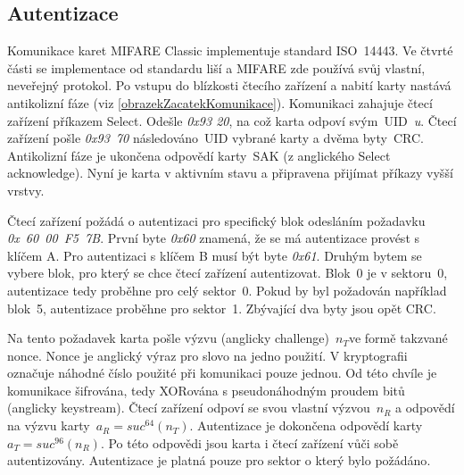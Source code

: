 \subsection{Autentizace}
\label{autentizace}
Komunikace karet MIFARE Classic implementuje standard ISO~14443. Ve čtvrté části se implementace od standardu liší a MIFARE zde používá svůj vlastní, neveřejný protokol. Po vstupu do blízkosti čtecího zařízení a nabití karty nastává antikolizní fáze (viz \ref{obrazekZacatekKomunikace}). Komunikaci zahajuje čtecí zařízení příkazem Select. Odešle \emph{0x93 20}, na což karta odpoví svým~UID~\emph{u}. Čtecí zařízení pošle \emph{0x93~70} následováno~UID vybrané karty a dvěma byty~CRC. Antikolizní fáze je ukončena odpovědí karty~SAK (z anglického Select acknowledge). Nyní je karta v aktivním stavu a připravena přijímat příkazy vyšší vrstvy\cite{PracticalAttackOnMIFARE}.
\par
Čtecí zařízení požádá o autentizaci pro specifický blok odesláním požadavku \emph{0x~60~00~F5~7B}. První byte \emph{0x60} znamená, že se má autentizace provést s klíčem A. Pro autentizaci s klíčem B musí být byte \emph{0x61}. Druhým bytem se vybere blok, pro který se chce čtecí zařízení autentizovat. Blok~0 je v sektoru~0, autentizace tedy proběhne pro celý sektor~0. Pokud by byl požadován například blok~5, autentizace proběhne pro sektor~1. Zbývající dva byty jsou opět CRC\cite{PracticalAttackOnMIFARE}. 
\par
Na tento požadavek karta pošle výzvu (anglicky challenge)~${n_T}$\footnotemark ve formě takzvané nonce\cite{Wirelessly_Pickpocketing}. Nonce je anglický výraz pro slovo na jedno použití. V kryptografii označuje náhodné číslo použité při komunikaci pouze jednou\cite{Nonce_Based_Encryption}. Od této chvíle je komunikace šifrována, tedy XORována s pseudonáhodným proudem bitů (anglicky keystream). Čtecí zařízení odpoví se svou vlastní výzvou~${n_R}$ a odpovědí na výzvu karty~${a_R = suc^{64}(n_T)}$. Autentizace je dokončena odpovědí karty~${a_T = suc^{96}(n_R)}$. Po této odpovědi jsou karta i čtecí zařízení vůči sobě autentizovány. Autentizace je platná pouze pro sektor o který bylo požádáno\cite{Wirelessly_Pickpocketing}. 


